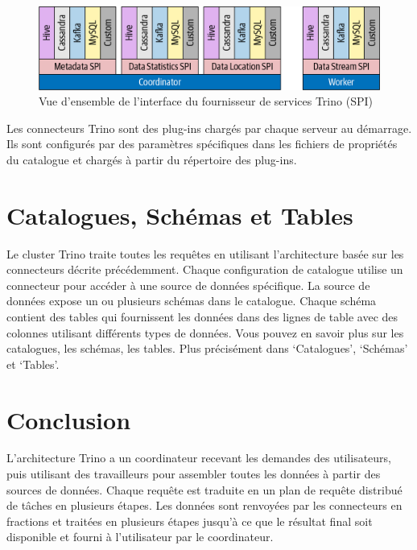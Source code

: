 \begin{figure}[htbp]
\centering
\includegraphics[width=\linewidth]{images/trino_connector.png}
\caption{Vue d'ensemble de l'interface du fournisseur de services Trino (SPI)}\label{fig:trino-connector}
\end{figure}

Les connecteurs Trino sont des plug-ins chargés par chaque serveur au démarrage. Ils sont configurés par des paramètres spécifiques dans les fichiers de propriétés du catalogue et chargés à partir du répertoire des plug-ins.

\section{Catalogues, Schémas et Tables}
Le cluster Trino traite toutes les requêtes en utilisant l'architecture basée sur les connecteurs décrite précédemment. Chaque configuration de catalogue utilise un connecteur pour accéder à une source de données spécifique. La source de données expose un ou plusieurs schémas dans le catalogue. Chaque schéma contient des tables qui fournissent les données dans des lignes de table avec des colonnes utilisant différents types de données. Vous pouvez en savoir plus sur les catalogues, les schémas, les tables. Plus précisément dans `Catalogues', `Schémas' et `Tables'.

\section*{Conclusion}
L'architecture Trino a un coordinateur recevant les demandes des utilisateurs, puis utilisant des travailleurs pour assembler toutes les données à partir des sources de données. Chaque requête est traduite en un plan de requête distribué de tâches en plusieurs étapes. Les données sont renvoyées par les connecteurs en fractions et traitées en plusieurs étapes jusqu'à ce que le résultat final soit disponible et fourni à l'utilisateur par le coordinateur.